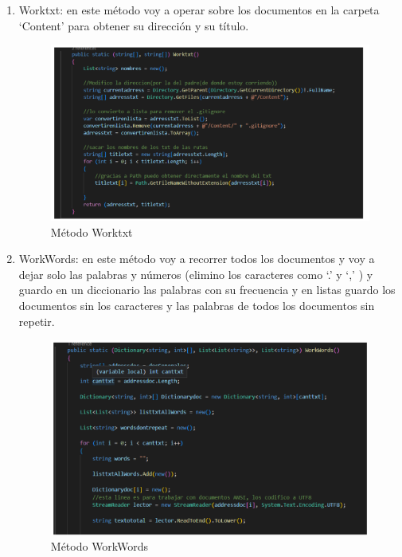 \documentclass[a4paper,12pt]{article}
\begin{document}
	\begin{enumerate}
		
		\item Worktxt: en este método voy a operar sobre los documentos en la carpeta ‘Content’ para obtener su dirección y su título.\\
		\begin{figure}[h]
			\centering
			\includegraphics[width=13cm]{figura1.png}
			\caption{Método Worktxt}
		\end{figure}
		\newpage
		\item WorkWords: en este método voy a recorrer todos los documentos y voy a dejar solo las palabras y números (elimino los caracteres como ‘.’ y ‘,’ ) y guardo en un diccionario las palabras con su frecuencia y en listas guardo los documentos sin los caracteres y las palabras de todos los documentos sin repetir.\\
		\begin{figure}[h]
			\centering
			\includegraphics[width=13cm]{figura2.png}
			\caption{Método WorkWords}
		\end{figure}
		

\end{enumerate}
\end{document}
